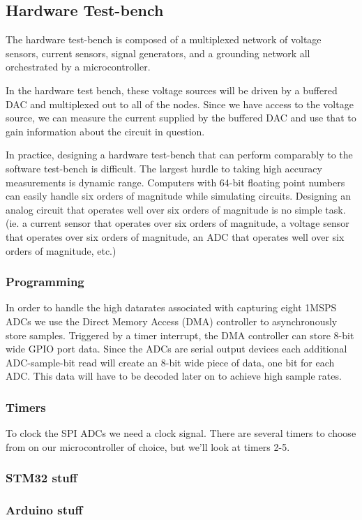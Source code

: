 \documentclass[11pt, a4paper]{article}
\begin{document}


\subsection{Hardware Test-bench}

The hardware test-bench is composed of a multiplexed network of voltage sensors, current sensors, signal generators, and a grounding network all orchestrated by a microcontroller.

In the hardware test bench, these voltage sources will be driven by a buffered DAC and multiplexed out to all of the nodes.
Since we have access to the voltage source, we can measure the current supplied by the buffered DAC and use that to gain information about the circuit in question.

In practice, designing a hardware test-bench that can perform comparably to the software test-bench is difficult.
The largest hurdle to taking high accuracy measurements is dynamic range.
Computers with 64-bit floating point numbers can easily handle six orders of magnitude while simulating circuits.
Designing an analog circuit that operates well over six orders of magnitude is no simple task.
(ie. a current sensor that operates over six orders of magnitude, a voltage sensor that operates over six orders of magnitude, an ADC that operates well over six orders of magnitude, etc.)


\subsubsection{Programming}

In order to handle the high datarates associated with capturing eight 1MSPS ADCs we use the Direct Memory Access (DMA) controller to asynchronously store samples.
Triggered by a timer interrupt, the DMA controller can store 8-bit wide GPIO port data.
Since the ADCs are serial output devices each additional ADC-sample-bit read will create an 8-bit wide piece of data, one bit for each ADC.
This data will have to be decoded later on to achieve high sample rates.

\subsubsection{Timers}

To clock the SPI ADCs we need a clock signal.
There are several timers to choose from on our microcontroller of choice, but we'll look at timers 2-5.

\subsubsection{STM32 stuff}

\subsubsection{Arduino stuff}
\begin{thebibliography}{1}
\end{thebibliography}
\end{document}
